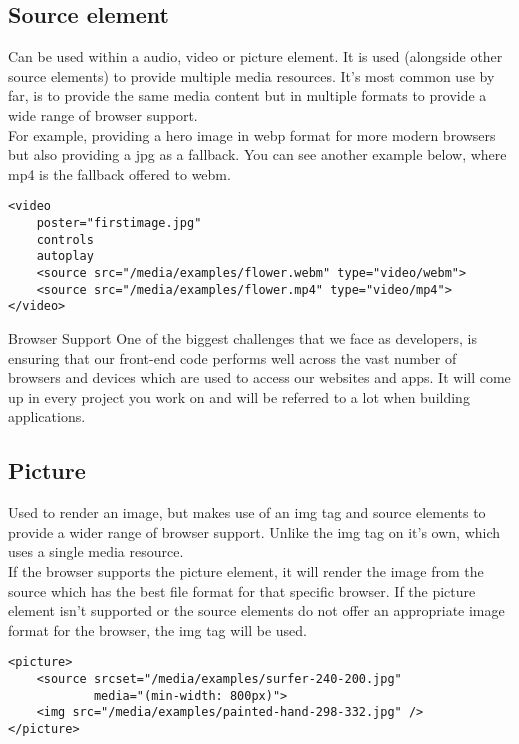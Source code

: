 \subsection{Source element}

Can be used within a audio, video or picture element. It is used (alongside other source elements) to provide multiple media resources. It's most common use by far, is to provide the same media content but in multiple formats to provide a wide range of browser support.
\\

For example, providing a hero image in webp format for more modern browsers but also providing a jpg as a fallback. You can see another example below, where mp4 is the fallback offered to webm.

\begin{verbatim}
<video
    poster="firstimage.jpg"
    controls
    autoplay
    <source src="/media/examples/flower.webm" type="video/webm">
    <source src="/media/examples/flower.mp4" type="video/mp4">
</video>
\end{verbatim}

\begin{infobox}{Browser Support}
    One of the biggest challenges that we face as developers, is ensuring that our front-end code performs well across the vast number of browsers and devices which are used to access our websites and apps. It will come up in every project you work on and will be referred to a lot when building applications.
\end{infobox}


\subsection{Picture}

Used to render an image, but makes use of an img tag and source elements to provide a wider range of browser support. Unlike the img tag on it's own, which uses a single media resource.
\\

If the browser supports the picture element, it will render the image from the source which has the best file format for that specific browser. If the picture element isn't supported or the source elements do not offer an appropriate image format for the browser, the img tag will be used.

\begin{verbatim}
<picture>
    <source srcset="/media/examples/surfer-240-200.jpg"
            media="(min-width: 800px)">
    <img src="/media/examples/painted-hand-298-332.jpg" />
</picture>
\end{verbatim}


